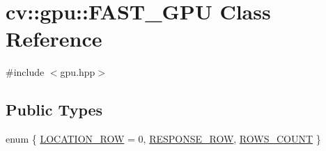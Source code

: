 \hypertarget{classcv_1_1gpu_1_1FAST__GPU}{\section{cv\-:\-:gpu\-:\-:F\-A\-S\-T\-\_\-\-G\-P\-U Class Reference}
\label{classcv_1_1gpu_1_1FAST__GPU}
}


{\ttfamily \#include $<$gpu.\-hpp$>$}

\subsection*{Public Types}
\begin{DoxyCompactItemize}
\item 
enum \{ \hyperlink{classcv_1_1gpu_1_1FAST__GPU_ae6594d8f3d725ddda6e2f9422f452876aa7d22ccbcd65a72e7c981c92515293f9}{L\-O\-C\-A\-T\-I\-O\-N\-\_\-\-R\-O\-W} = 0, 
\hyperlink{classcv_1_1gpu_1_1FAST__GPU_ae6594d8f3d725ddda6e2f9422f452876a2df36c0c99dfc29326822c3739eac1d0}{R\-E\-S\-P\-O\-N\-S\-E\-\_\-\-R\-O\-W}, 
\hyperlink{classcv_1_1gpu_1_1FAST__GPU_ae6594d8f3d725ddda6e2f9422f452876a07c32b647113fa5892988c7b27d188df}{R\-O\-W\-S\-\_\-\-C\-O\-U\-N\-T}
 \}
\end{DoxyCompactItemize}
